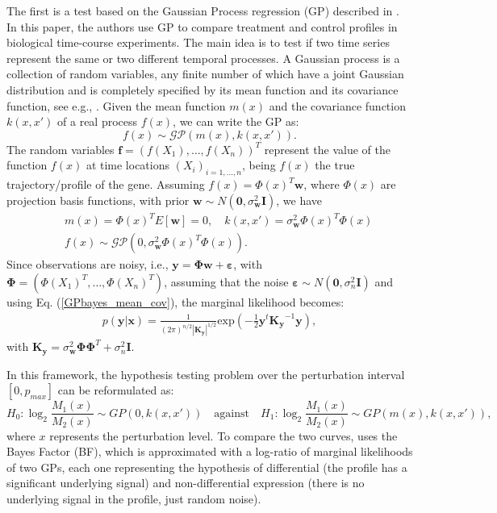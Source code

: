 The first is a test based on the Gaussian Process regression (GP) described in \cite{KalaitzisLawrence_paper:2011}. In this paper, the authors use GP to compare treatment and control profiles in biological time-course experiments. The main idea is to test if two time series represent the same or two different temporal processes.
A Gaussian process is a collection of random variables, any finite number of which have a joint Gaussian distribution and is completely specified by its mean function and its covariance function, see e.g., \cite{Rasmussen:2006}. Given the mean function $m\left(x\right)$ and the covariance function $k\left(x,x'\right)$ of a real process $f\left(x\right)$, we can write the GP as:
\begin{equation}
f\left(x\right) \sim \mathcal{GP}\left(m\left(x\right), k\left(x,x'\right)\right).
\end{equation}
The random variables $\mathbf{f}=\left(f\left(X_1\right),\dots,f\left(X_n\right)\right)^T$ represent the value of the function $f(x)$ at time locations $\left(X_i\right)_{i=1,\dots,n}$, being $f(x)$ the true trajectory/profile of the gene. Assuming $f(x)=\Phi(x)^T\mathbf{w}$, where $\Phi(x)$ are projection basis functions, with prior $\mathbf{w} \sim N(\mathbf{0},\sigma_{\mathbf{w}}^2\mathbf{I})$, we have
\begin{align}
&&m\left(x\right)=\Phi\left(x\right)^TE\left[\mathbf{w}\right]=0, \quad k\left(x,x'\right)=\sigma_{\mathbf{w}}^2\Phi\left(x\right)^T\Phi\left(x\right) \label{GPbayes_mean_cov}\\
&&f\left(x\right) \sim \mathcal{GP}\left(0,\sigma_{\mathbf{w}}^2\Phi\left(x\right)^T\Phi\left(x\right)\right).
\end{align} 
Since observations are noisy, i.e., $\mathbf{y}=\mathbf{\Phi w}+\pmb{\varepsilon}$, with $\mathbf{\Phi}=(\Phi(X_1)^T,\dots,\Phi(X_n)^T)$, assuming that the noise $\pmb{\varepsilon} \sim N(\mathbf{0},\sigma_n^2\mathbf{I})$ and using 
Eq. (\ref{GPbayes_mean_cov}), the marginal likelihood becomes:
\begin{align}
p(\mathbf{y} | \mathbf{x})=\frac{1}{\left(2\pi\right)^{n/2}\left|\mathbf{K_y}\right|^{1/2}}\mathrm{exp}\left(-\frac{1}{2}\mathbf{y}^t\mathbf{K_y}^{-1}\mathbf{y}\right), \label{GPmarginal}
\end{align}
with $\mathbf{K_y}=\sigma_{\mathbf{w}}^2\mathbf{\Phi}\mathbf{\Phi}^T+\sigma_n^2\mathbf{I}$.

In this framework, the hypothesis testing problem over the perturbation interval $[0,p_{max}]$ can be reformulated as:
\begin{equation}
H_0: \log_2  \frac{M_1\left(x\right)}{M_2\left(x\right)}  \sim GP\left(0,k\left(x,x'\right)\right)  \quad \mathrm{against} \quad H_1: \log_2  \frac{M_1\left(x\right)}{M_2\left(x\right)} \sim GP\left(m\left(x\right),k\left(x,x'\right)\right)  ,
\end{equation}
where $x$ represents the perturbation level.
To compare the two curves,  uses the Bayes Factor (BF), which is approximated with a log-ratio of marginal likelihoods of two GPs, each one representing the hypothesis of differential (the profile has a significant underlying signal) and non-differential expression (there is no underlying signal in the profile, just random noise). 

